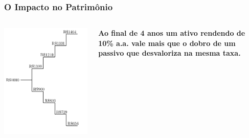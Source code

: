 \begin{frame}[c]\frametitle{O Impacto no Patrimônio}
  \begin{columns}
    \begin{column}{0.5\textwidth}
      \includegraphics[width=\textwidth]{../figuras/dobra4.pdf}
    \end{column}
    \begin{column}{0.5\textwidth}
      \centering
      \textbf{\large Ao final de 4 anos um ativo rendendo de 10\% a.a. vale mais que o dobro de um passivo que desvaloriza na mesma taxa.}
    \end{column}
  \end{columns}
\end{frame}

